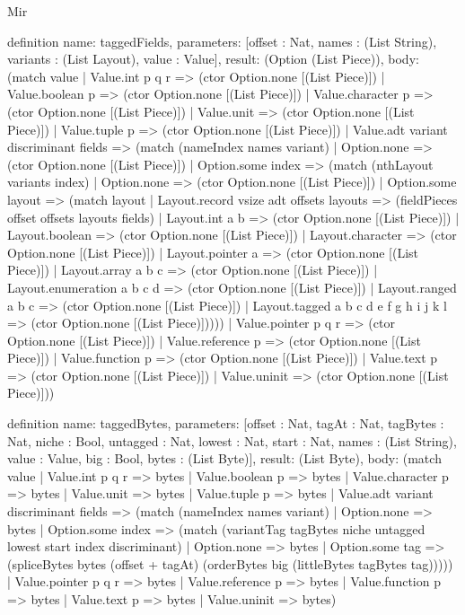 \begin{lexlean}{Mir}
\begin{semanticmodule}
definition{
  name: taggedFields,
  parameters: [offset : Nat, names : (List String), variants : (List Layout), value : Value],
  result: (Option (List Piece)),
  body: (match value
    | Value.int p q r => (ctor Option.none [(List Piece)])
    | Value.boolean p => (ctor Option.none [(List Piece)])
    | Value.character p => (ctor Option.none [(List Piece)])
    | Value.unit => (ctor Option.none [(List Piece)])
    | Value.tuple p => (ctor Option.none [(List Piece)])
    | Value.adt variant discriminant fields => (match (nameIndex names variant)
      | Option.none => (ctor Option.none [(List Piece)])
      | Option.some index => (match (nthLayout variants index)
        | Option.none => (ctor Option.none [(List Piece)])
        | Option.some layout => (match layout
          | Layout.record vsize adt offsets layouts => (fieldPieces offset offsets layouts fields)
          | Layout.int a b => (ctor Option.none [(List Piece)])
          | Layout.boolean => (ctor Option.none [(List Piece)])
          | Layout.character => (ctor Option.none [(List Piece)])
          | Layout.pointer a => (ctor Option.none [(List Piece)])
          | Layout.array a b c => (ctor Option.none [(List Piece)])
          | Layout.enumeration a b c d => (ctor Option.none [(List Piece)])
          | Layout.ranged a b c => (ctor Option.none [(List Piece)])
          | Layout.tagged a b c d e f g h i j k l => (ctor Option.none [(List Piece)]))))
    | Value.pointer p q r => (ctor Option.none [(List Piece)])
    | Value.reference p => (ctor Option.none [(List Piece)])
    | Value.function p => (ctor Option.none [(List Piece)])
    | Value.text p => (ctor Option.none [(List Piece)])
    | Value.uninit => (ctor Option.none [(List Piece)]))
}

definition{
  name: taggedBytes,
  parameters: [offset : Nat, tagAt : Nat, tagBytes : Nat, niche : Bool, untagged : Nat, lowest : Nat, start : Nat, names : (List String), value : Value, big : Bool, bytes : (List Byte)],
  result: (List Byte),
  body: (match value
    | Value.int p q r => bytes
    | Value.boolean p => bytes
    | Value.character p => bytes
    | Value.unit => bytes
    | Value.tuple p => bytes
    | Value.adt variant discriminant fields => (match (nameIndex names variant)
      | Option.none => bytes
      | Option.some index => (match (variantTag tagBytes niche untagged lowest start index discriminant)
        | Option.none => bytes
        | Option.some tag => (spliceBytes bytes (offset + tagAt) (orderBytes big (littleBytes tagBytes tag)))))
    | Value.pointer p q r => bytes
    | Value.reference p => bytes
    | Value.function p => bytes
    | Value.text p => bytes
    | Value.uninit => bytes)
}


\end{semanticmodule}
\end{lexlean}
